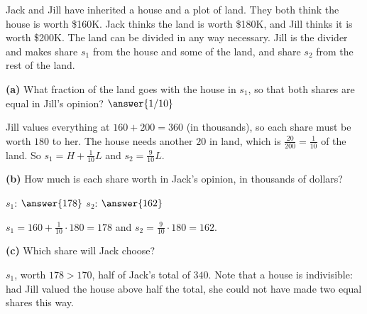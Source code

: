 \documentclass[12pt]{ximera}
\begin{document}
\begin{problem}
Jack and Jill have inherited a house and a plot of land. They both think the house is
worth \$160K. Jack thinks the land is worth \$180K, and Jill thinks it is
worth \$200K. The land can be divided in any way necessary. Jill is the divider and
makes share $s_1$ from the house and some of the land, and share $s_2$ from the rest of the
land.

\begin{prompt}
\textbf{(a)} What fraction of the land goes with the house in $s_1$, so that both shares
are equal in Jill's opinion? $\answer{1/10}$
\begin{feedback}
Jill values everything at $160+200=360$ (in thousands), so each share must be worth
$180$ to her. The house needs another $20$ in land, which is $\frac{20}{200}=\frac1{10}$
of the land. So $s_1=H+\frac1{10}L$ and $s_2=\frac9{10}L$.
\end{feedback}
\end{prompt}

\begin{prompt}
\textbf{(b)} How much is each share worth in Jack's opinion, in thousands of
dollars?

$s_1$: $\answer{178}$ \quad $s_2$: $\answer{162}$
\begin{feedback}
$s_1=160+\frac1{10}\cdot180=178$ and $s_2=\frac9{10}\cdot180=162$.
\end{feedback}
\end{prompt}

\begin{prompt}
\textbf{(c)} Which share will Jack choose?
\begin{multipleChoice}
\end{multipleChoice}
\begin{feedback}
$s_1$, worth $178>170$, half of Jack's total of $340$. Note that a house is indivisible: had Jill valued the house above half the total, she could not have made two equal shares this way.
\end{feedback}
\end{prompt}
\end{problem}
\end{document}
